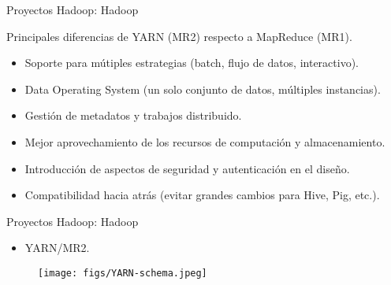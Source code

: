 \begin{frame}{Proyectos Hadoop: Hadoop}
 \begin{wideitemize}
  \item Principales diferencias de YARN (MR2) respecto a MapReduce (MR1).
  \begin{itemize}
   \item Soporte para mútiples estrategias (batch, flujo de datos, interactivo).
   \item Data Operating System (un solo conjunto de datos, múltiples instancias).
   \item Gestión de metadatos y trabajos distribuido.
   \item Mejor aprovechamiento de los recursos de computación y almacenamiento.
   \item Introducción de aspectos de seguridad y autenticación en el diseño.
   \item Compatibilidad hacia atrás (evitar grandes cambios para Hive, Pig, etc.).
  \end{itemize}

 \end{wideitemize}

\end{frame}


\begin{frame}{Proyectos Hadoop: Hadoop}
\begin{itemize}
 \item YARN/MR2.
\end{itemize}

\begin{figure}
 \centering
 \texttt{[image: figs/YARN-schema.jpeg]}
\end{figure}

\end{frame}


